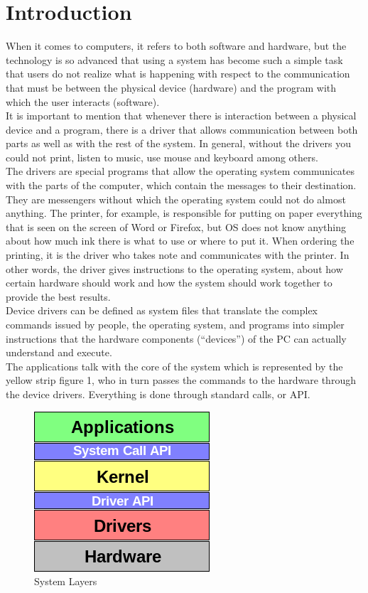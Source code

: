 \documentclass[12pt,twoside]{article}
\begin{document}



\section{Introduction}


When it comes to computers, it refers to both software and hardware, but the technology is so advanced that using a system has become such a simple task that users do not realize what is happening with respect to the communication that must be between the physical device (hardware) and the program with which the user interacts (software).\\

It is important to mention that whenever there is interaction between a physical device and a program, there is a driver that allows communication between both parts as well as with the rest of the system. In general, without the drivers you could not print, listen to music, use mouse and keyboard among others.\\

The drivers are special programs that allow the operating system  communicates with the parts of the computer, which contain the messages to their destination. They are messengers without which the operating system could not do almost anything. The printer, for example, is responsible for putting on paper everything that is seen on the screen of Word or Firefox, but OS does not know anything about how much ink there is what to use or where to put it. When ordering the printing, it is the driver who takes note and communicates with the printer. In other words, the driver gives instructions to the operating system, about how certain hardware should work and how the system should work together to provide the best results.\\

Device drivers can be defined as system files that translate the complex commands issued by people, the operating system, and programs into simpler instructions that the hardware components (“devices”) of the PC can actually understand and execute.\\

The applications talk with the core of the system which is represented by the yellow strip figure 1, who in turn passes the commands to the hardware through the device drivers. Everything is done through standard calls, or API.

\begin{figure}[H]
\centering
\includegraphics[width = 0.4\hsize]{./figures/esquema.png}
\caption{System Layers}
\label{fig:esquema1 de capas}
\end{figure}
\end{document}
